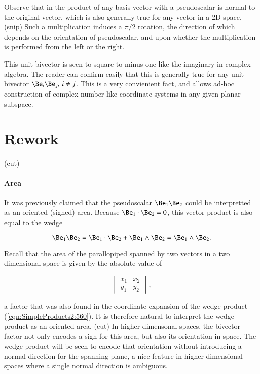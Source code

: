 Observe that in  the product of any basis vector with a pseudoscalar is normal to the original vector, which is also generally true for any vector in a 2D space,
(snip)
Such a multiplication induces a \( \pi/2 \) rotation, the direction of which depends on the orientation of pseudoscalar, and upon whether the multiplication is performed from the left or the right.

This unit bivector is seen to square to minus one like the imaginary in complex algebra.
The reader can confirm easily that this is generally true for any unit bivector \( \Be_i \Be_j, \, i \ne j \).
This is a very convienient fact, and allows ad-hoc construction of complex number like coordinate systems in any given planar subspace.

\section{Rework}
(cut)
\paragraph{Area}

It was previously claimed that the pseudoscalar \( \Be_1 \Be_2 \) could be interpretted as an oriented (signed) area.
Because \( \Be_1 \cdot \Be_2 = 0 \), this vector product is also equal to the wedge

\begin{dmath}\label{eqn:SimpleProducts2:640}
\Be_1 \Be_2 = \Be_1 \cdot \Be_2 +
\Be_1 \wedge \Be_2
=
\Be_1 \wedge \Be_2.
\end{dmath}

Recall that the area of the parallopiped spanned by two vectors in a two dimensional space is given by the absolute value of

\begin{dmath}\label{eqn:SimpleProducts2:660}
\begin{vmatrix}
   x_1 & x_2 \\
   y_1 & y_2
\end{vmatrix},
\end{dmath}

a factor that was also found in the coordinate expansion of the wedge product (\cref{eqn:SimpleProducts2:560}).
It is therefore natural to interpret the wedge product as an oriented area.
(cut)
In higher dimensonal spaces, the bivector factor not only encodes a sign for this area, but also its orientation in space.
The wedge product will be seen to encode that orientation without introducing a normal direction for the spanning plane, a nice feature in higher dimensional spaces where a single normal direction is ambiguous.


